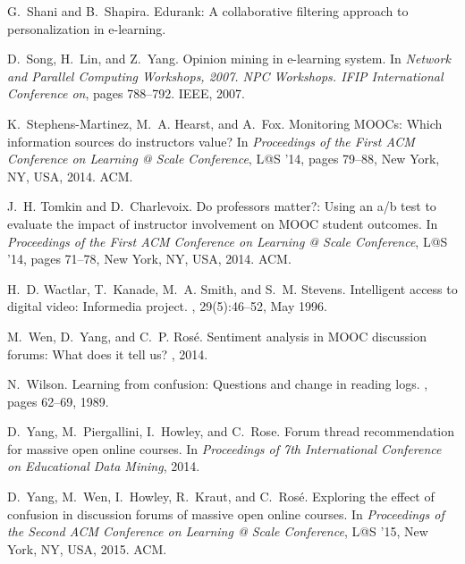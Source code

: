 \documentclass{edm_template}
\begin{document}
\begin{thebibliography}{10}
G.~Shani and B.~Shapira.
\newblock Edurank: A collaborative filtering approach to personalization in
  e-learning.

D.~Song, H.~Lin, and Z.~Yang.
\newblock Opinion mining in e-learning system.
\newblock In {\em Network and Parallel Computing Workshops, 2007. NPC
  Workshops. IFIP International Conference on}, pages 788--792. IEEE, 2007.

K.~Stephens-Martinez, M.~A. Hearst, and A.~Fox.
\newblock Monitoring {MOOC}s: Which information sources do instructors value?
\newblock In {\em Proceedings of the First ACM Conference on Learning @ Scale
  Conference}, L@S '14, pages 79--88, New York, NY, USA, 2014. ACM.

J.~H. Tomkin and D.~Charlevoix.
\newblock Do professors matter?: Using an a/b test to evaluate the impact of
  instructor involvement on {MOOC} student outcomes.
\newblock In {\em Proceedings of the First ACM Conference on Learning @ Scale
  Conference}, L@S '14, pages 71--78, New York, NY, USA, 2014. ACM.

H.~D. Wactlar, T.~Kanade, M.~A. Smith, and S.~M. Stevens.
\newblock Intelligent access to digital video: Informedia project.
, 29(5):46--52, May 1996.

M.~Wen, D.~Yang, and C.~P. Ros{\'e}.
\newblock Sentiment analysis in {MOOC} discussion forums: What does it tell us?
, 2014.

N.~Wilson.
\newblock Learning from confusion: Questions and change in reading logs.
, pages 62--69, 1989.

D.~Yang, M.~Piergallini, I.~Howley, and C.~Rose.
\newblock Forum thread recommendation for massive open online courses.
\newblock In {\em Proceedings of 7th International Conference on Educational
  Data Mining}, 2014.

D.~Yang, M.~Wen, I.~Howley, R.~Kraut, and C.~Ros{\'e}.
\newblock Exploring the effect of confusion in discussion forums of massive
  open online courses.
\newblock In {\em Proceedings of the Second ACM Conference on Learning @ Scale
  Conference}, L@S '15, New York, NY, USA, 2015. ACM.

\end{thebibliography}
\end{document}
